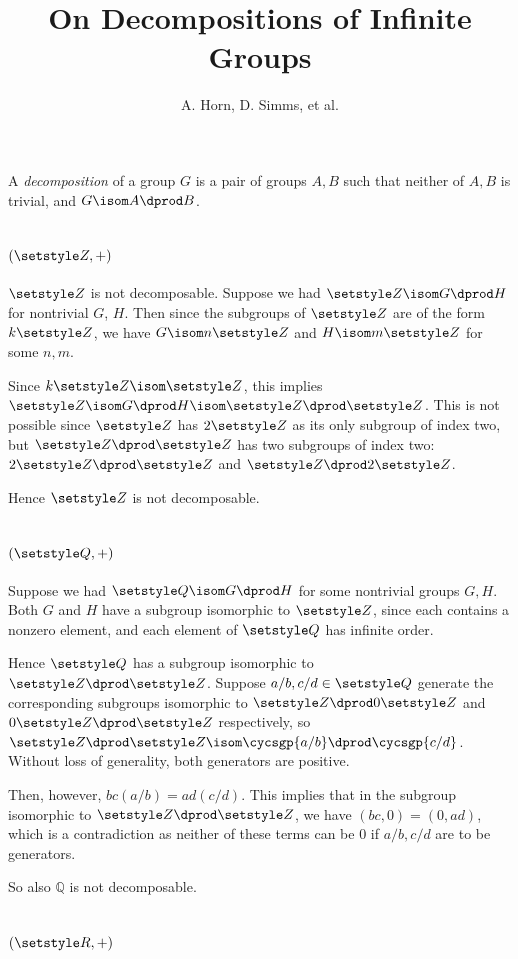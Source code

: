 \documentclass[fleqn,a4paper,11pt]{article}
\title{On Decompositions of Infinite Groups}
\author{A. Horn, D. Simms, et al.}
\begin{document}
\maketitle

A \emph{decomposition} of a group \(G\) is a pair of groups \(A, B\) such that
neither of \(A, B\) is trivial, and \(G \isom A \dprod B\).

\section{\((\Z, +)\)}

\(\Z\) is not decomposable. Suppose we had \(\Z \isom G \dprod H\) for
nontrivial \(G\), \(H\). Then since the subgroups of \(\Z\) are of the form
\(k\Z\), we have \(G \isom n\Z\) and \(H \isom m\Z\) for some \(n, m\).

Since \(k\Z \isom \Z\), this implies \(\Z \isom G \dprod H \isom \Z \dprod \Z\).
This is not possible since \(\Z\) has \(2\Z\) as its only subgroup of index two,
but \(\Z \dprod \Z\) has two subgroups of index two: \(2\Z \dprod \Z\) and \(\Z
\dprod 2\Z\).

Hence \(\Z\) is not decomposable.

\section{\((\Q, +)\)}

Suppose we had \(\Q \isom G \dprod H\) for some nontrivial groups \(G, H\). Both
\(G\) and \(H\) have a subgroup isomorphic to \(\Z\), since each contains a
nonzero element, and each element of \(\Q\) has infinite order.

Hence \(\Q\) has a subgroup isomorphic to \(\Z \dprod \Z\). Suppose
\(a/b, c/d \in \Q\) generate the corresponding subgroups isomorphic to
\(\Z \dprod 0\Z\) and \(0\Z \dprod \Z\) respectively, so
\(\Z \dprod \Z \isom \cycsgp{a/b} \dprod \cycsgp{c/d}\). Without loss of
generality, both generators are positive.

Then, however, \(bc(a/b) = ad(c/d)\). This implies that in the subgroup
isomorphic to \(\Z \dprod \Z\), we have \((bc, 0) = (0, ad)\), which is a
contradiction as neither of these terms can be \(0\) if \(a/b, c/d\) are to be
generators.

So also \(\mathbb Q\) is not decomposable.

\section{\((\R, +)\)}
\end{document}
